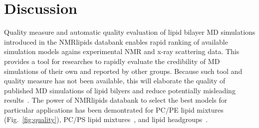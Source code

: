 \documentclass[fleqn,10pt]{wlscirep}
\begin{document}




 

\section{Discussion}


Quality measure and automatic quality evaluation of lipid bilayer MD simulations introduced in the NMRlipids databank enables rapid ranking of available simulation models agains experimental NMR and x-ray scattering data. This provides a tool for researches to rapidly evaluate the credibility of MD simulations of their own and reported by other groups. Because such tool and quality measure has not been available, this will elaborate the quality of published MD simulations of lipid bilyers and reduce potentially misleading results~\cite{antila22b}. The power of NMRlipids databank to select the best models for particular applications has been demontrated for PC/PE lipid mixtures (Fig.~\ref{fig:quality}), PC/PS lipid mixtures~\cite{antila22b}, and lipid headgroups~\cite{bacle21}.
\end{document}
